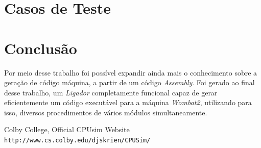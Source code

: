 \documentclass{article}
\begin{document}
\section{Casos de Teste}

\section{Conclusão}

Por meio desse trabalho foi possível expandir ainda mais o conhecimento sobre a geração de código máquina, a partir de um código \textit{Assembly}. Foi gerado ao final desse trabalho, um \textit{Ligador} completamente funcional capaz de gerar eficientemente um código executável para a máquina \textit{Wombat2}, utilizando para isso, diversos procedimentos de vários módulos simultaneamente.


\begin{thebibliography}{9}

Colby College, Official CPUsim Website
\\\texttt{http://www.cs.colby.edu/djskrien/CPUSim/}
\end{thebibliography}
\end{document}
